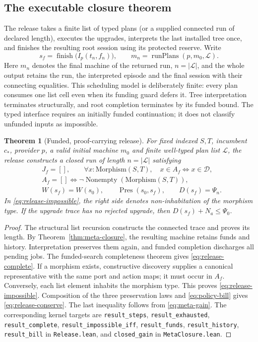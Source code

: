 \documentclass[10pt,letterpaper]{article}
\newtheorem{theorem}{Theorem}[section]
\newcommand{\CanonRef}{\mathcal D}
\newcommand{\Pres}{\operatorname{Pres}}
\newcommand{\finish}{\operatorname{finish}}
\newcommand{\rc}[1]{\texttt{#1}}
\begin{document}
\subsection{The executable closure theorem}
The release takes a finite list of typed plans (or a supplied connected run of declared length), executes the upgrades, interprets the last installed tree once, and finishes the resulting root session using its protected reserve. Write
\begin{equation}\label{eq:release-pipeline}
 s_f=\finish\bigl(I_p(t_n,f_n)\bigr),\qquad
 m_n=\operatorname{runPlans}(p,m_0,\mathcal L).
\end{equation}
Here $m_n$ denotes the final machine of the returned run, $n=|\mathcal L|$, and the whole output retains the run, the interpreted episode and the final session with their connecting equalities. This scheduling model is deliberately finite: every plan consumes one list cell even when its funding guard defers it. Tree interpretation terminates structurally, and root completion terminates by its funded bound. The typed interface requires an initially funded continuation; it does not classify unfunded inputs as impossible.

\begin{theorem}[Funded, proof-carrying release]\label{thm:release}
For fixed indexed $S,T$, incumbent $c_*$, provider $p$, a valid initial machine $m_0$ and finite well-typed plan list $\mathcal L$, the release constructs a closed run of length $n=|\mathcal L|$ satisfying
\begin{align}
 &J_f=[] ,\qquad \forall x:\mathrm{Morphism}(S,T),\quad x\in A_f\iff x\in\CanonRef,\label{eq:release-complete}\\
 &A_f=[]\iff \neg\operatorname{Nonempty}(\mathrm{Morphism}(S,T)),\label{eq:release-impossible}\\
 &W(s_f)=W(s_0),\qquad \Pres(s_0,s_f),\qquad D(s_f)=\Psi_n.\label{eq:release-conserve}
\end{align}
In \eqref{eq:release-impossible}, the right side denotes non-inhabitation of the morphism type. If the upgrade trace has no rejected upgrade, then $D(s_f)+N_a\le\Psi_0$.
\end{theorem}
\begin{proof}
The structural list recursion constructs the connected trace and proves its length. By Theorem~\ref{thm:meta-closure}, the resulting machine retains funds and history. Interpretation preserves them again, and funded completion discharges all pending jobs. The funded-search completeness theorem gives \eqref{eq:release-complete}. If a morphism exists, constructive discovery supplies a canonical representative with the same port and action maps; it must occur in $A_f$. Conversely, each list element inhabits the morphism type. This proves \eqref{eq:release-impossible}. Composition of the three preservation laws and \eqref{eq:policy-bill} gives \eqref{eq:release-conserve}. The last inequality follows from \eqref{eq:meta-gain}. The corresponding kernel targets are \rc{result\_steps}, \rc{result\_exhausted}, \rc{result\_complete}, \rc{result\_impossible\_iff}, \rc{result\_funds}, \rc{result\_history}, \rc{result\_bill} in \rc{Release.lean}, and \rc{closed\_gain} in \rc{MetaClosure.lean}.
\end{proof}
\end{document}

